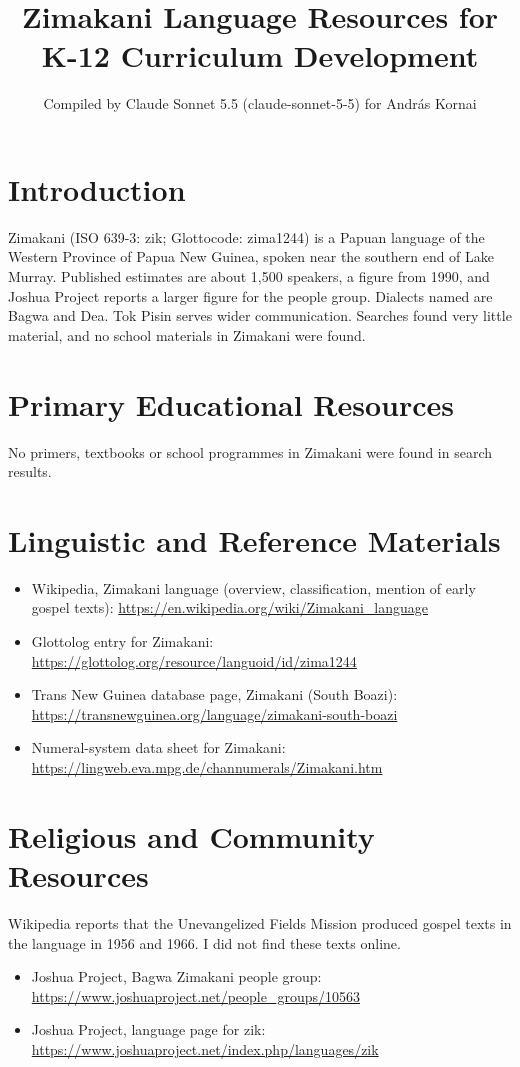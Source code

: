 \documentclass[12pt]{article}
\title{Zimakani Language Resources for K-12 Curriculum Development}
\author{Compiled by Claude Sonnet 5.5 (claude-sonnet-5-5) for Andr\'as Kornai}
\date{}
\begin{document}
\maketitle

\section{Introduction}
Zimakani (ISO 639-3: zik; Glottocode: zima1244) is a Papuan language of the Western Province of Papua New Guinea, spoken near the southern end of Lake Murray. Published estimates are about 1,500 speakers, a figure from 1990, and Joshua Project reports a larger figure for the people group. Dialects named are Bagwa and Dea. Tok Pisin serves wider communication. Searches found very little material, and no school materials in Zimakani were found.

\section{Primary Educational Resources}
No primers, textbooks or school programmes in Zimakani were found in search results.

\section{Linguistic and Reference Materials}
\begin{itemize}
\item Wikipedia, Zimakani language (overview, classification, mention of early gospel texts): \url{https://en.wikipedia.org/wiki/Zimakani_language}
\item Glottolog entry for Zimakani: \url{https://glottolog.org/resource/languoid/id/zima1244}
\item Trans New Guinea database page, Zimakani (South Boazi): \url{https://transnewguinea.org/language/zimakani-south-boazi}
\item Numeral-system data sheet for Zimakani: \url{https://lingweb.eva.mpg.de/channumerals/Zimakani.htm}
\end{itemize}

\section{Religious and Community Resources}
Wikipedia reports that the Unevangelized Fields Mission produced gospel texts in the language in 1956 and 1966. I did not find these texts online.
\begin{itemize}
\item Joshua Project, Bagwa Zimakani people group: \url{https://www.joshuaproject.net/people_groups/10563}
\item Joshua Project, language page for zik: \url{https://www.joshuaproject.net/index.php/languages/zik}
\end{itemize}
\end{document}
